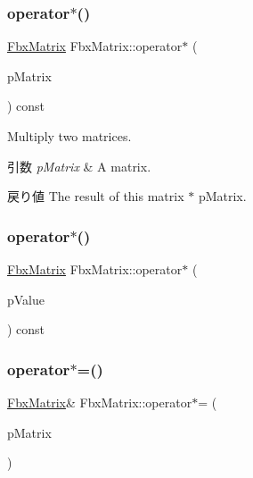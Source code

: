 \subsubsection{\texorpdfstring{operator$\ast$()}{operator*()}\hspace{0.1cm}{\footnotesize\ttfamily [1/2]}}
{\footnotesize\ttfamily \hyperlink{class_fbx_matrix}{Fbx\+Matrix} Fbx\+Matrix\+::operator$\ast$ (\begin{DoxyParamCaption}\item[{const \hyperlink{class_fbx_matrix}{Fbx\+Matrix} \&}]{p\+Matrix }\end{DoxyParamCaption}) const}

Multiply two matrices. 
\begin{DoxyParams}{引数}
{\em p\+Matrix} & A matrix. \\
\hline
\end{DoxyParams}
\begin{DoxyReturn}{戻り値}
The result of this matrix $\ast$ p\+Matrix. 
\end{DoxyReturn}
\mbox{\label{class_fbx_matrix_a456c331260776abbc6773ce327437cac}} 
\subsubsection{\texorpdfstring{operator$\ast$()}{operator*()}\hspace{0.1cm}{\footnotesize\ttfamily [2/2]}}
{\footnotesize\ttfamily \hyperlink{class_fbx_matrix}{Fbx\+Matrix} Fbx\+Matrix\+::operator$\ast$ (\begin{DoxyParamCaption}\item[{\hyperlink{class_fbx_matrix_a01f8be57393e5d9973b23897c29d5520}{double}}]{p\+Value }\end{DoxyParamCaption}) const}

\mbox{\label{class_fbx_matrix_a1ef7240d9cedabb803a3701a0002ad33}} 
\subsubsection{\texorpdfstring{operator$\ast$=()}{operator*=()}\hspace{0.1cm}{\footnotesize\ttfamily [1/2]}}
{\footnotesize\ttfamily \hyperlink{class_fbx_matrix}{Fbx\+Matrix}\& Fbx\+Matrix\+::operator$\ast$= (\begin{DoxyParamCaption}\item[{const \hyperlink{class_fbx_matrix}{Fbx\+Matrix} \&}]{p\+Matrix }\end{DoxyParamCaption})}

